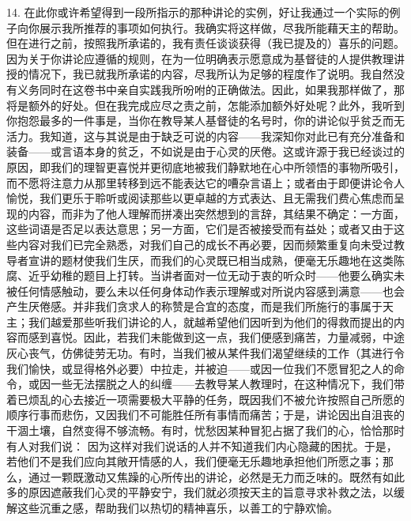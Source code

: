 14. 在此你或许希望得到一段所指示的那种讲论的实例，好让我通过一个实际的例子向你展示我所推荐的事项如何执行。我确实将这样做，尽我所能藉天主的帮助。但在进行之前，按照我所承诺的，我有责任谈谈获得（我已提及的）喜乐的问题。因为关于你讲论应遵循的规则，在为一位明确表示愿意成为基督徒的人提供教理讲授的情况下，我已就我所承诺的内容，尽我所认为足够的程度作了说明。我自然没有义务同时在这卷书中亲自实践我所吩咐的正确做法。因此，如果我那样做了，那将是额外的好处。但在我完成应尽之责之前，怎能添加额外好处呢？此外，我听到你抱怨最多的一件事是，当你在教导某人基督徒的名号时，你的讲论似乎贫乏而无活力。我知道，这与其说是由于缺乏可说的内容——我深知你对此已有充分准备和装备——或言语本身的贫乏，不如说是由于心灵的厌倦。这或许源于我已经谈过的原因，即我们的理智更喜悦并更彻底地被我们静默地在心中所领悟的事物所吸引，而不愿将注意力从那里转移到远不能表达它的嘈杂言语上；或者由于即便讲论令人愉悦，我们更乐于聆听或阅读那些以更卓越的方式表达、且无需我们费心焦虑而呈现的内容，而非为了他人理解而拼凑出突然想到的言辞，其结果不确定：一方面，这些词语是否足以表达意思；另一方面，它们是否被接受而有益处；或者又由于这些内容对我们已完全熟悉，对我们自己的成长不再必要，因而频繁重复向未受过教导者宣讲的题材使我们生厌，而我们的心灵既已相当成熟，便毫无乐趣地在这类陈腐、近乎幼稚的题目上打转。当讲者面对一位无动于衷的听众时——他要么确实未被任何情感触动，要么未以任何身体动作表示理解或对所说内容感到满意——也会产生厌倦感。并非我们贪求人的称赞是合宜的态度，而是我们所施行的事属于天主；我们越爱那些听我们讲论的人，就越希望他们因听到为他们的得救而提出的内容而感到喜悦。因此，若我们未能做到这一点，我们便感到痛苦，力量减弱，中途灰心丧气，仿佛徒劳无功。有时，当我们被从某件我们渴望继续的工作（其进行令我们愉快，或显得格外必要）中拉走，并被迫——或因一位我们不愿冒犯之人的命令，或因一些无法摆脱之人的纠缠——去教导某人教理时，在这种情况下，我们带着已烦乱的心去接近一项需要极大平静的任务，既因我们不被允许按照自己所愿的顺序行事而悲伤，又因我们不可能胜任所有事情而痛苦；于是，讲论因出自沮丧的干涸土壤，自然变得不够流畅。有时，忧愁因某种冒犯占据了我们的心，恰恰那时有人对我们说： 因为这样对我们说话的人并不知道我们内心隐藏的困扰。于是，若他们不是我们应向其敞开情感的人，我们便毫无乐趣地承担他们所愿之事；那么，通过一颗既激动又焦躁的心所传出的讲论，必然是无力而乏味的。既然有如此多的原因遮蔽我们心灵的平静安宁，我们就必须按天主的旨意寻求补救之法，以缓解这些沉重之感，帮助我们以热切的精神喜乐，以善工的宁静欢愉。\par

